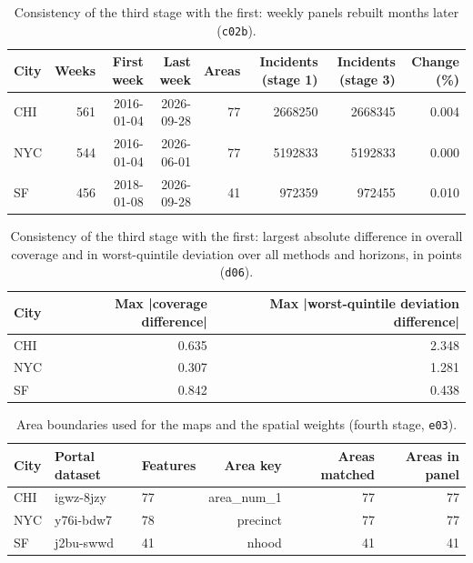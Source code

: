 \documentclass[11pt]{article}
\begin{document}
\begin{table}[H]\centering\scriptsize\setlength{\tabcolsep}{3pt}
\caption{Consistency of the third stage with the first: weekly panels rebuilt months later (\texttt{c02b}).}\label{tab:s8a}
\begin{tabularx}{\linewidth}{lrrrrrrr}\toprule
City & Weeks & First week & Last week & Areas & Incidents (stage 1) & Incidents (stage 3) & Change (\%)\\\midrule
CHI & 561 & 2016-01-04 & 2026-09-28 & 77 & 2668250 & 2668345 & 0.004 \\
NYC & 544 & 2016-01-04 & 2026-06-01 & 77 & 5192833 & 5192833 & 0.000 \\
SF & 456 & 2018-01-08 & 2026-09-28 & 41 & 972359 & 972455 & 0.010 \\
\bottomrule\end{tabularx}\end{table}

\begin{table}[H]\centering\scriptsize\setlength{\tabcolsep}{3pt}
\caption{Consistency of the third stage with the first: largest absolute difference in overall coverage and in worst-quintile deviation over all methods and horizons, in points (\texttt{d06}).}\label{tab:s8b}
\begin{tabularx}{\linewidth}{lrr}\toprule
City & Max |coverage difference| & Max |worst-quintile deviation difference|\\\midrule
CHI & 0.635 & 2.348 \\
NYC & 0.307 & 1.281 \\
SF & 0.842 & 0.438 \\
\bottomrule\end{tabularx}\end{table}

\begin{table}[H]\centering\scriptsize\setlength{\tabcolsep}{3pt}
\caption{Area boundaries used for the maps and the spatial weights (fourth stage, \texttt{e03}).}\label{tab:s9}
\begin{tabularx}{\linewidth}{lllrrr}\toprule
City & Portal dataset & Features & Area key & Areas matched & Areas in panel\\\midrule
CHI & igwz-8jzy & 77 & area\_num\_1 & 77 & 77 \\
NYC & y76i-bdw7 & 78 & precinct & 77 & 77 \\
SF & j2bu-swwd & 41 & nhood & 41 & 41 \\
\bottomrule\end{tabularx}\end{table}
\end{document}
